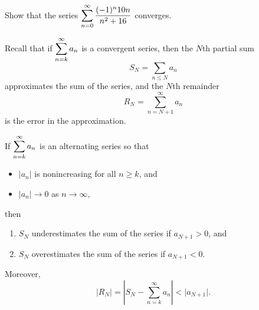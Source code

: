 \begin{example}
Show that the series $\displaystyle\sum_{n=0}^\infty\frac{(-1)^n 10n}{n^2+16}$ converges.
\end{example}
\ifdefined\SOLUTION
{}
\fi

\newpage

\begin{remark}
Recall that if $\displaystyle\sum_{n=k}^\infty a_n$ is a convergent series, then the $N$th partial sum
\begin{equation*}
S_N = \sum_{n\le N} a_n
\end{equation*}
approximates the sum of the series, and the $N$th remainder
\begin{equation*}
 R_N = \sum_{n=N+1}^\infty a_n
\end{equation*}
is the error in the approximation.
\end{remark}

\begin{theorem}
If $\displaystyle\sum_{n=k}^\infty a_n$ is an alternating series so that
\begin{itemize}
\item $|a_n|$ is nonincreasing for all $n\ge k$, and
\item $|a_n|\to 0$ as $n\to\infty$,
\end{itemize}
then
\begin{enumerate}
\item $S_N$ underestimates the sum of the series if $a_{N+1}>0$, and
\item $S_N$ overestimates the sum of the series if $a_{N+1}<0$.
\end{enumerate}
Moreover, 
\begin{equation*}
\Big| R_N \Big| = \left| S_N - \sum_{n=k}^\infty a_n\right| < \Big| a_{N+1}\Big|.
\end{equation*}
\end{theorem}

